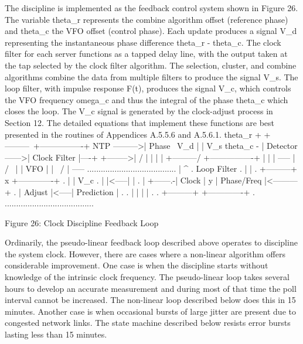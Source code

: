    The discipline is implemented as the feedback control system shown in
   Figure 26.  The variable theta_r represents the combine algorithm
   offset (reference phase) and theta_c the VFO offset (control phase).
   Each update produces a signal V_d representing the instantaneous
   phase difference theta_r - theta_c.  The clock filter for each server
   functions as a tapped delay line, with the output taken at the tap
   selected by the clock filter algorithm.  The selection, cluster, and
   combine algorithms combine the data from multiple filters to produce
   the signal V_s.  The loop filter, with impulse response F(t),
   produces the signal V_c, which controls the VFO frequency omega_c and
   thus the integral of the phase theta_c which closes the loop.  The
   V_c signal is generated by the clock-adjust process in Section 12.
   The detailed equations that implement these functions are best
   presented in the routines of Appendices A.5.5.6 and A.5.6.1.
                 theta_r + +---------\        +----------------+
            NTP --------->|  Phase   \  V_d  |                | V_s
                theta_c - | Detector  ------>|  Clock Filter  |----+
                +-------->|          /       |                |    |
                |         +---------/        +----------------+    |
                |                                                  |
              -----                                                |
             /     \                                               |
             | VFO |                                               |
             \     /                                               |
              -----    .......................................     |
                ^      .            Loop Filter              .     |
                |      . +---------+   x  +-------------+    .     |
                | V_c  . |         |<-----|             |    .     |
                +------.-|  Clock  |   y  | Phase/Freq  |<---------+
                       . | Adjust  |<-----| Prediction  |    .
                       . |         |      |             |    .
                       . +---------+      +-------------+    .
                       .......................................

                 Figure 26: Clock Discipline Feedback Loop

   Ordinarily, the pseudo-linear feedback loop described above operates
   to discipline the system clock.  However, there are cases where a
   non-linear algorithm offers considerable improvement.  One case is
   when the discipline starts without knowledge of the intrinsic clock
   frequency.  The pseudo-linear loop takes several hours to develop an
   accurate measurement and during most of that time the poll interval
   cannot be increased.  The non-linear loop described below does this
   in 15 minutes.  Another case is when occasional bursts of large
   jitter are present due to congested network links.  The state machine
   described below resists error bursts lasting less than 15 minutes.

